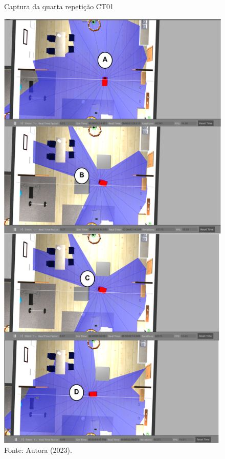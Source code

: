 \begin{figure}[H]
    \centering
    \caption{Captura da quarta repetição CT01}
    \includegraphics[scale=0.35]{ct01_4.png}
    \caption*{Fonte: Autora (2023).}
    \label{fig:ct01_4}
\end{figure}

